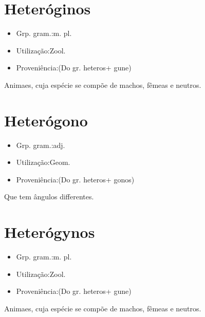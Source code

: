 \documentclass{article}
\begin{document}
\section{Heteróginos}
\begin{itemize}
\item {Grp. gram.:m. pl.}
\end{itemize}
\begin{itemize}
\item {Utilização:Zool.}
\end{itemize}
\begin{itemize}
\item {Proveniência:(Do gr. \textunderscore heteros\textunderscore  + \textunderscore gune\textunderscore )}
\end{itemize}
Animaes, cuja espécie se compõe de machos, fêmeas e neutros.
\section{Heterógono}
\begin{itemize}
\item {Grp. gram.:adj.}
\end{itemize}
\begin{itemize}
\item {Utilização:Geom.}
\end{itemize}
\begin{itemize}
\item {Proveniência:(Do gr. \textunderscore heteros\textunderscore  + \textunderscore gonos\textunderscore )}
\end{itemize}
Que tem ângulos differentes.
\section{Heterógynos}
\begin{itemize}
\item {Grp. gram.:m. pl.}
\end{itemize}
\begin{itemize}
\item {Utilização:Zool.}
\end{itemize}
\begin{itemize}
\item {Proveniência:(Do gr. \textunderscore heteros\textunderscore  + \textunderscore gune\textunderscore )}
\end{itemize}
Animaes, cuja espécie se compõe de machos, fêmeas e neutros.
\end{document}
